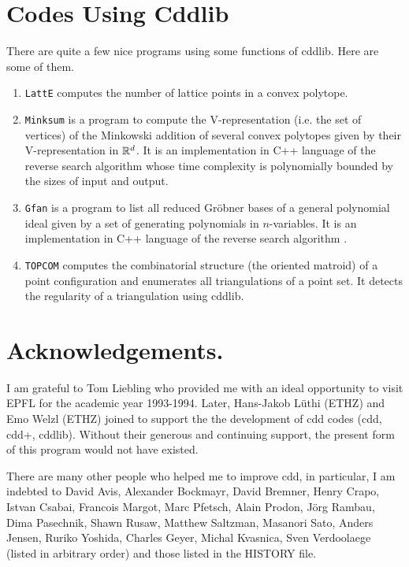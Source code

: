 \documentclass[11pt]{article}
\newcommand {\0} {{\bf 0}}
\newcommand{\R}{{\Bbb R}}
\begin{document}
\section{Codes Using Cddlib}  \label{USERCODES}

There are quite a few nice programs using some functions of cddlib.  
Here are some of them.


\begin{enumerate}

\item {\tt LattE} \cite{dhhhty-latte-05} computes the number of lattice points
in a convex polytope.

\item {\tt Minksum} \cite{w-msv-05} is a program to compute the V-representation
(i.e. the set of vertices) of the Minkowski addition of several convex polytopes
given by their V-representation in $\R^d$.  It is an implementation in C++ language 
of the reverse search algorithm \cite{f-fzctmacp-04} whose time complexity is
polynomially bounded by the sizes of input and output.

\item {\tt Gfan} \cite{j-gvum-05} is a program to list all reduced Gr\"obner
bases of a general polynomial ideal given by a set of generating polynomials
in $n$-variables.   It is an implementation in C++ language 
of the reverse search algorithm \cite{fjt-cgf-05}.


\item {\tt TOPCOM} \cite{r-topcom-05} computes the combinatorial structure
(the oriented matroid) of a point configuration and enumerates all triangulations
of a point set.   It detects the regularity of a triangulation using cddlib.

\end{enumerate}


\section*{Acknowledgements.} 
I am  grateful to Tom  Liebling who
provided me with an ideal opportunity to visit EPFL
for the academic year 1993-1994.  Later, Hans-Jakob L\"uthi (ETHZ) and 
Emo Welzl  (ETHZ) joined to support the 
the development of cdd codes (cdd, cdd+, cddlib).
Without their generous and continuing support, the present form of 
this program would not have existed.

There are many other people who helped me to improve cdd, in particular,
I am indebted to  David Avis, 
Alexander Bockmayr, David Bremner, Henry Crapo, Istvan Csabai, 
Francois Margot, Marc Pfetsch, Alain Prodon, J\"org Rambau, Dima Pasechnik,
Shawn Rusaw, Matthew Saltzman, Masanori Sato, Anders Jensen,
Ruriko Yoshida, Charles Geyer, Michal Kvasnica, Sven Verdoolaege
 (listed in arbitrary order) and those listed
in the HISTORY file.




\end{document}

